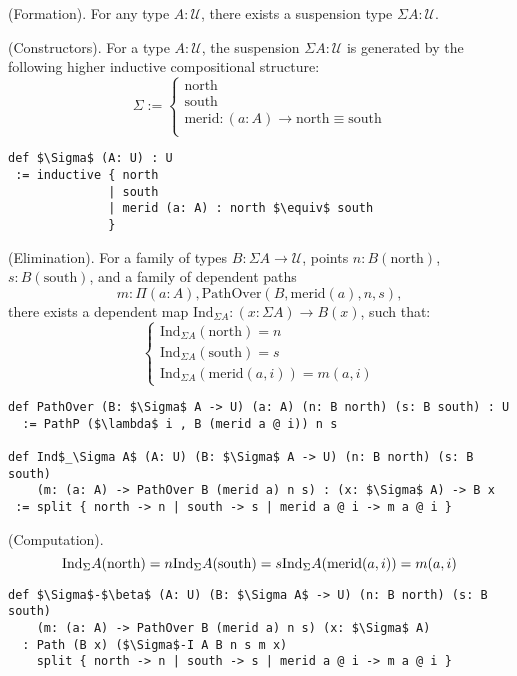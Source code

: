 \begin{definition} (Formation).
For any type \( A : \mathcal{U} \), there exists a suspension type \( \Sigma A : \mathcal{U} \).
\end{definition}

\begin{definition} (Constructors).
For a type \( A : \mathcal{U} \), the suspension \( \Sigma A : \mathcal{U} \)
is generated by the following higher inductive compositional structure:
\[
\Sigma :=
\begin{cases}
\text{north} \\
\text{south} \\
\text{merid} : (a : A) \rightarrow \text{north} \equiv \text{south} \\
\end{cases}
\]
\begin{lstlisting}[mathescape=true]
def $\Sigma$ (A: U) : U
 := inductive { north
              | south
              | merid (a: A) : north $\equiv$ south
              }
\end{lstlisting}
\end{definition}

\begin{theorem} (Elimination).
For a family of types \( B : \Sigma A \to \mathcal{U} \), points \( n : B(\text{north}) \), \( s : B(\text{south}) \), and a family
of dependent paths
\[
  m : \Pi (a : A), \text{PathOver}(B,\text{merid}(a),n,s),
\]
there exists a dependent map \( \text{Ind}_{\Sigma A} : (x : \Sigma A) \to B(x) \), such that:
\[
\begin{cases}
\text{Ind}_{\Sigma A}(\text{north}) = n \\
\text{Ind}_{\Sigma A}(\text{south}) = s \\
\text{Ind}_{\Sigma A}(\text{merid}(a,i)) = m(a,i)
\end{cases}
\]
\begin{lstlisting}[mathescape=true]
def PathOver (B: $\Sigma$ A -> U) (a: A) (n: B north) (s: B south) : U
  := PathP ($\lambda$ i , B (merid a @ i)) n s

def Ind$_\Sigma A$ (A: U) (B: $\Sigma$ A -> U) (n: B north) (s: B south)
    (m: (a: A) -> PathOver B (merid a) n s) : (x: $\Sigma$ A) -> B x
 := split { north -> n | south -> s | merid a @ i -> m a @ i }
\end{lstlisting}
\end{theorem}

\begin{theorem} (Computation).
\[
    \text{Ind}_\Sigma A(\text{north}) = n \\
    \text{Ind}_\Sigma A(\text{south}) = s \\
    \text{Ind}_\Sigma A(\text{merid}(a,i)) = m(a,i)
\]
\begin{lstlisting}[mathescape=true]
def $\Sigma$-$\beta$ (A: U) (B: $\Sigma A$ -> U) (n: B north) (s: B south)
    (m: (a: A) -> PathOver B (merid a) n s) (x: $\Sigma$ A)
  : Path (B x) ($\Sigma$-I A B n s m x)
    split { north -> n | south -> s | merid a @ i -> m a @ i }
\end{lstlisting}
\end{theorem}

